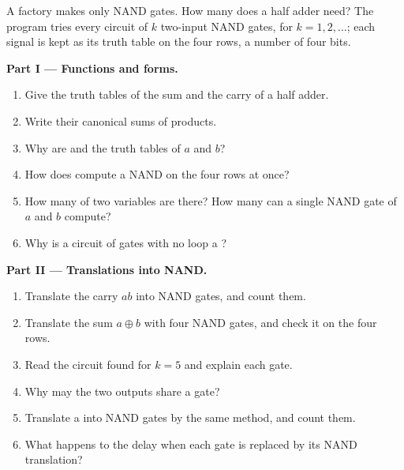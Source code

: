 \begin{problem}\label{pb:b1:combinational-circuits:1}
A factory makes only NAND gates. How many does a half adder need? The program tries every circuit of $k$ two-input NAND
gates, for $k = 1, 2, \dots$; each signal is kept as its truth table on the four rows, a number of four bits.
\label{lst:b1:combinational-circuits:min-nand}
\label{out:b1:combinational-circuits:min-nand}

\medskip\noindent\textbf{Part I --- Functions and forms.}
\begin{enumerate}
\item Give the truth tables of the sum and the carry of a half adder.
\item Write their canonical sums of products.
\item Why are  and  the truth tables of $a$ and $b$?
\item How does  compute a NAND on the four rows at once?
\item How many  of two variables are there? How many can a single NAND gate of $a$ and $b$ compute?
\item Why is a circuit of gates with no loop a ?
\end{enumerate}

\medskip\noindent\textbf{Part II --- Translations into NAND.}
\begin{enumerate}[resume]
\item Translate the carry $ab$ into NAND gates, and count them.
\item Translate the sum $a \oplus b$ with four NAND gates, and check it on the four rows.
\item Read the circuit found for $k = 5$ and explain each gate.
\item Why may the two outputs share a gate?
\item Translate a  into NAND gates by the same method, and count them.
\item What happens to the delay when each gate is replaced by its NAND translation?
\end{enumerate}


\end{problem}

